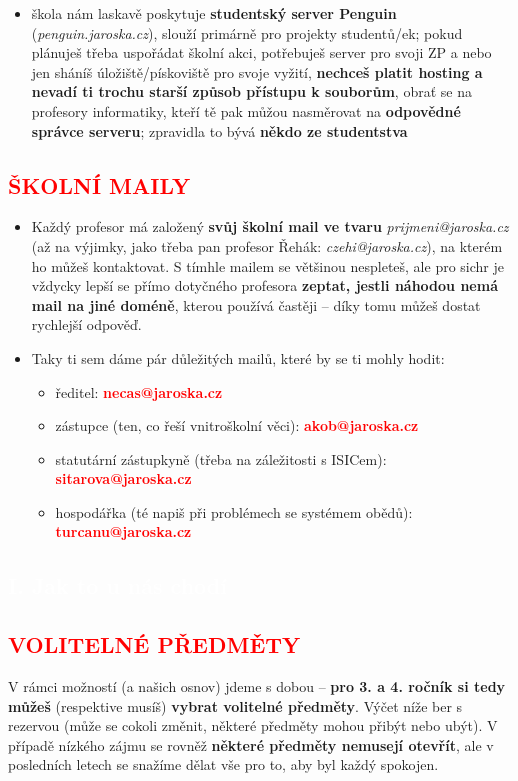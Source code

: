 \documentclass[a5paper, twoside]{article}
\newcommand{\polonadpis}[4]{
  \vspace*{-50pt}
  \begin{tcolorbox}[colback = #2, boxrule = 0pt, grow to left by = #4,  grow to right by = #4, arc=8pt, height = 30pt]
    \vspace*{5pt}
    \centering \subsection*{\textcolor{#3}{#1}}
  \end{tcolorbox}
}
\newcommand{\podnadpis}[2]{
  \subsection*{\textcolor{#2}{#1}}
}
\begin{document}
\begin{itemize}[leftmargin=10pt]
	\item  škola nám laskavě poskytuje \textbf{studentský server Penguin} (\textit{penguin.jaroska.cz}), slouží primárně pro projekty studentů/ek; pokud plánuješ třeba uspořádat školní akci, potřebuješ server pro svoji ZP a nebo jen sháníš úložiště/pískoviště pro svoje vyžití, \textbf{nechceš platit hosting a nevadí ti trochu starší způsob přístupu k souborům}, obrať se na profesory informatiky, kteří tě pak můžou nasměrovat na \textbf{odpovědné správce serveru}; zpravidla to bývá \textbf{někdo ze studentstva}
\end{itemize}

\podnadpis{ŠKOLNÍ MAILY}{red}
\begin{itemize}[leftmargin=10pt]
	\item Každý profesor má založený \textbf{svůj školní mail ve tvaru} \textit{prijmeni@jaroska.cz} (až na výjimky, jako třeba pan profesor Řehák: \textit{czehi@jaroska.cz}), na kterém ho můžeš kontaktovat. S tímhle mailem se většinou nespleteš, ale pro sichr je vždycky lepší se přímo dotyčného profesora \textbf{zeptat, jestli náhodou nemá mail na jiné doméně}, kterou používá častěji -- díky tomu můžeš dostat rychlejší odpověď.
	\item  Taky ti sem dáme pár důležitých mailů, které by se ti mohly hodit:
  \begin{itemize}[leftmargin=0pt]
    \item ředitel: \textcolor{red}{\textbf{necas@jaroska.cz}}
    \item zástupce (ten, co řeší vnitroškolní věci): \textcolor{red}{\textbf{akob@jaroska.cz}}
    \item statutární zástupkyně (třeba na záležitosti s ISICem): \textcolor{red}{\textbf{sitarova@jaroska.cz}}
    \item hospodářka (té napiš při problémech se systémem obědů): \textcolor{red}{\textbf{turcanu@jaroska.cz}}
  \end{itemize}
\end{itemize}

\newpage

\polonadpis{I. Jak to u nás chodí}{red}{white}{-4.1cm}

\podnadpis{VOLITELNÉ PŘEDMĚTY}{red}

\noindent V rámci možností (a našich osnov) jdeme s dobou -- \textbf{pro 3. a 4. ročník si tedy můžeš} (respektive musíš) \textbf{vybrat volitelné předměty}. Výčet níže ber s rezervou
(může se cokoli změnit, některé předměty mohou přibýt nebo ubýt). V případě
nízkého zájmu se rovněž \textbf{některé předměty nemusejí otevřít}, ale v posledních
letech se snažíme dělat vše pro to, aby byl každý spokojen.
\end{document}
